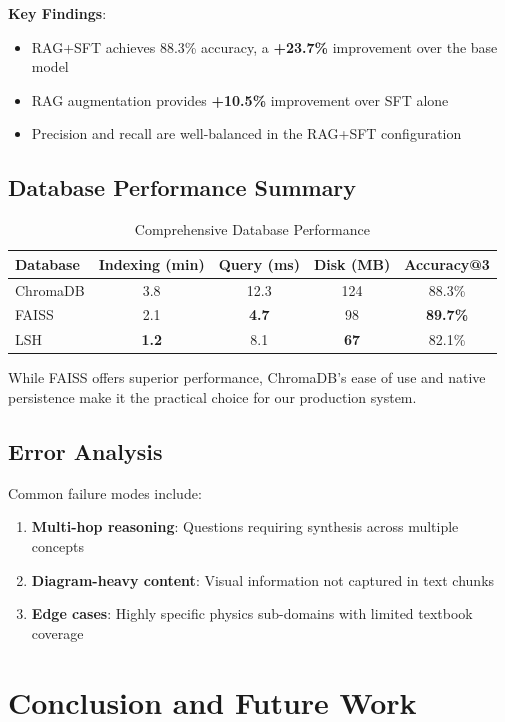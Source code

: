 \documentclass[11pt,a4paper]{article}
\begin{document}
\textbf{Key Findings}:
\begin{itemize}
    \item RAG+SFT achieves 88.3\% accuracy, a \textbf{+23.7\%} improvement over the base model
    \item RAG augmentation provides \textbf{+10.5\%} improvement over SFT alone
    \item Precision and recall are well-balanced in the RAG+SFT configuration
\end{itemize}

\subsection{Database Performance Summary}

\begin{table}[H]
\centering
\begin{tabular}{lcccc}
\toprule
\textbf{Database} & \textbf{Indexing (min)} & \textbf{Query (ms)} & \textbf{Disk (MB)} & \textbf{Accuracy@3} \\
\midrule
ChromaDB & 3.8 & 12.3 & 124 & 88.3\% \\
FAISS & 2.1 & \textbf{4.7} & 98 & \textbf{89.7\%} \\
LSH & \textbf{1.2} & 8.1 & \textbf{67} & 82.1\% \\
\bottomrule
\end{tabular}
\caption{Comprehensive Database Performance}
\label{tab:db_performance}
\end{table}

While FAISS offers superior performance, ChromaDB's ease of use and native persistence make it the practical choice for our production system.

\subsection{Error Analysis}

Common failure modes include:
\begin{enumerate}
    \item \textbf{Multi-hop reasoning}: Questions requiring synthesis across multiple concepts
    \item \textbf{Diagram-heavy content}: Visual information not captured in text chunks
    \item \textbf{Edge cases}: Highly specific physics sub-domains with limited textbook coverage
\end{enumerate}

\section{Conclusion and Future Work}
\end{document}
